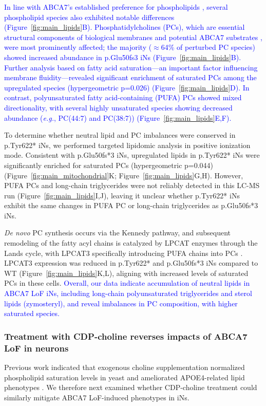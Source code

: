 \documentclass[12pt]{article}
\begin{document}
\newcommand{\quoteB}{\textcolor{blue}{In line with ABCA7's established preference for phospholipids \cite{Tomioka2017-sq,Picataggi2022-hf,Fang2025}, several phospholipid species also exhibited notable differences (Figure~\ref{fig:main_lipids}B). Phosphatidylcholines (PCs), which are essential structural components of biological membranes and potential ABCA7 substrates \cite{LeThiMy2022-dp,Fang2025}, were most prominently affected; the majority ($\approx$64\% of perturbed PC species) showed increased abundance in p.Glu50fs3 iNs (Figure~\ref{fig:main_lipids}B). Further analysis based on fatty acid saturation—an important factor influencing membrane fluidity—revealed significant enrichment of saturated PCs among the upregulated species (hypergeometric p=0.026) (Figure~\ref{fig:main_lipids}D). In contrast, polyunsaturated fatty acid-containing (PUFA) PCs showed mixed directionality, with several highly unsaturated species showing decreased abundance (\textit{e.g.}, PC(44:7) and PC(38:7)) (Figure~\ref{fig:main_lipids}E,F).}}
\quoteB

To determine whether neutral lipid and PC imbalances were conserved in p.Tyr622* iNs, we performed targeted lipidomic analysis in positive ionization mode. Consistent with p.Glu50fs*3 iNs, upregulated lipids in p.Tyr622* iNs were significantly enriched for saturated PCs (hypergeometric p=0.044) (Figure~\ref{fig:main_mitochondrial}K; Figure~\ref{fig:main_lipids}G,H). However, PUFA PCs and long-chain triglycerides were not reliably detected in this LC-MS run (Figure~\ref{fig:main_lipids}I,J), leaving it unclear whether p.Tyr622* iNs exhibit the same changes in PUFA PC or long-chain triglycerides as p.Glu50fs*3 iNs.

\textit{De novo} PC synthesis occurs via the Kennedy pathway, and subsequent remodeling of the fatty acyl chains is catalyzed by LPCAT enzymes through the Lands cycle, with LPCAT3 specifically introducing PUFA chains into PCs \cite{Boumann2003-ew,Wang2019-om,Zhao2008-pq}. LPCAT3 expression was reduced in p.Tyr622* and p.Glu50fs*3 iNs compared to WT (Figure~\ref{fig:main_lipids}K,L), aligning with increased levels of saturated PCs in these cells. \newcommand{\quoteH}{\textcolor{blue}{Overall, our data indicate accumulation of neutral lipids in ABCA7 LoF iNs, including long-chain polyunsaturated triglycerides and sterol lipids (zymosteryl), and reveal imbalances in PC composition, with higher saturated species.\label{quoteH-label}}}
\quoteH

\subsubsection{Treatment with CDP-choline reverses impacts of ABCA7 LoF in neurons}
Previous work indicated that exogenous choline supplementation normalized phospholipid saturation levels in yeast and ameliorated APOE4-related lipid phenotypes \cite{Boumann2006-nz,Sienski2021-zt}. We therefore next examined whether CDP-choline treatment could similarly mitigate ABCA7 LoF-induced phenotypes in iNs.
\end{document}
